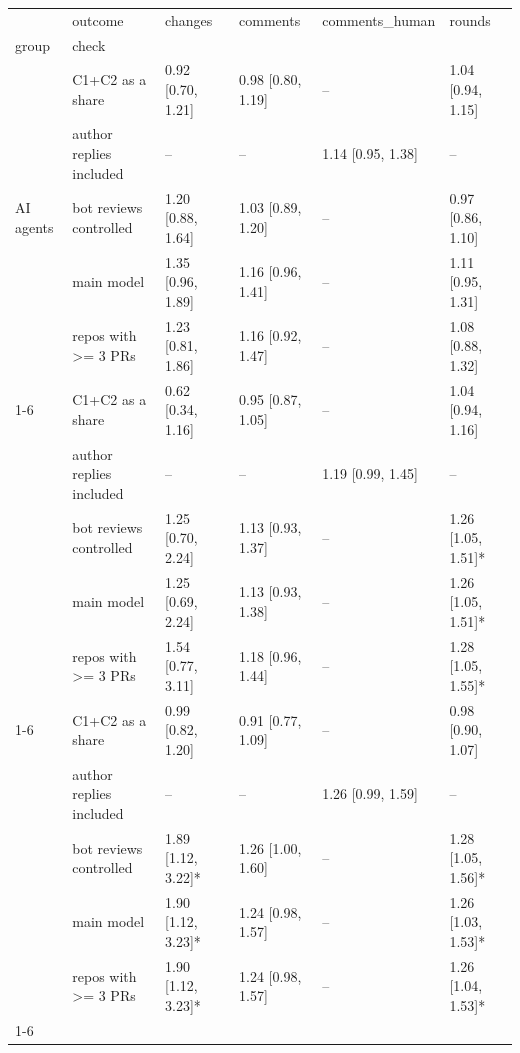 \begin{tabular}{llllll}
\toprule
 & outcome & changes & comments & comments\_human & rounds \\
group & check &  &  &  &  \\
\midrule
\multirow[t]{5}{*}{AI agents} & C1+C2 as a share & 0.92 [0.70, 1.21] & 0.98 [0.80, 1.19] & -- & 1.04 [0.94, 1.15] \\
 & author replies included & -- & -- & 1.14 [0.95, 1.38] & -- \\
 & bot reviews controlled & 1.20 [0.88, 1.64] & 1.03 [0.89, 1.20] & -- & 0.97 [0.86, 1.10] \\
 & main model & 1.35 [0.96, 1.89] & 1.16 [0.96, 1.41] & -- & 1.11 [0.95, 1.31] \\
 & repos with >= 3 PRs & 1.23 [0.81, 1.86] & 1.16 [0.92, 1.47] & -- & 1.08 [0.88, 1.32] \\
\cline{1-6}
\multirow[t]{5}{*}{Human} & C1+C2 as a share & 0.62 [0.34, 1.16] & 0.95 [0.87, 1.05] & -- & 1.04 [0.94, 1.16] \\
 & author replies included & -- & -- & 1.19 [0.99, 1.45] & -- \\
 & bot reviews controlled & 1.25 [0.70, 2.24] & 1.13 [0.93, 1.37] & -- & 1.26 [1.05, 1.51]* \\
 & main model & 1.25 [0.69, 2.24] & 1.13 [0.93, 1.38] & -- & 1.26 [1.05, 1.51]* \\
 & repos with >= 3 PRs & 1.54 [0.77, 3.11] & 1.18 [0.96, 1.44] & -- & 1.28 [1.05, 1.55]* \\
\cline{1-6}
\multirow[t]{5}{*}{Human (pre-ChatGPT)} & C1+C2 as a share & 0.99 [0.82, 1.20] & 0.91 [0.77, 1.09] & -- & 0.98 [0.90, 1.07] \\
 & author replies included & -- & -- & 1.26 [0.99, 1.59] & -- \\
 & bot reviews controlled & 1.89 [1.12, 3.22]* & 1.26 [1.00, 1.60] & -- & 1.28 [1.05, 1.56]* \\
 & main model & 1.90 [1.12, 3.23]* & 1.24 [0.98, 1.57] & -- & 1.26 [1.03, 1.53]* \\
 & repos with >= 3 PRs & 1.90 [1.12, 3.23]* & 1.24 [0.98, 1.57] & -- & 1.26 [1.04, 1.53]* \\
\cline{1-6}
\bottomrule
\end{tabular}
